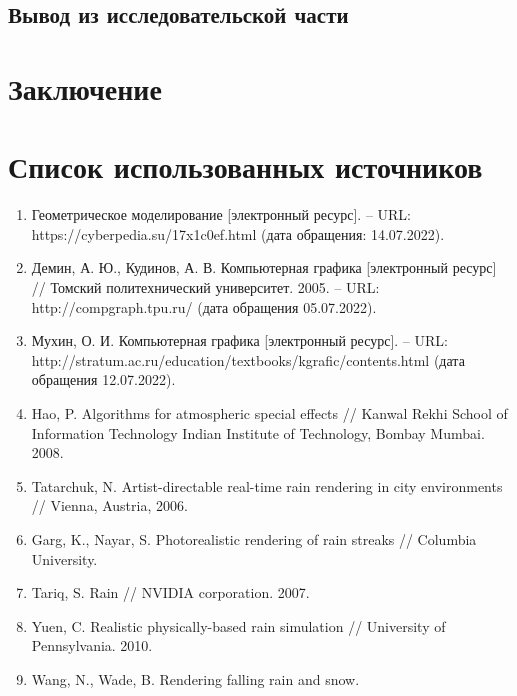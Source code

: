 \section*{Вывод из исследовательской части}

{\center\chapter*{Заключение}}

{\center\chapter*{Список использованных источников}}

\begin{enumerate}
\item
Геометрическое моделирование [электронный ресурс]. – URL: https://cyberpedia.su/17x1c0ef.html (дата обращения: 14.07.2022).
\item
Демин, А. Ю., Кудинов, А. В. Компьютерная графика [электронный ресурс] // Томский политехнический университет. 2005. – URL: http://compgraph.tpu.ru/ (дата обращения 05.07.2022).
\item
Мухин, О. И. Компьютерная графика [электронный ресурс]. – URL: http://stratum.ac.ru/education/textbooks/kgrafic/contents.html (дата обращения 12.07.2022).
\item
Hao, P. Algorithms for atmospheric special effects // Kanwal Rekhi School of Information Technology Indian Institute of Technology, Bombay Mumbai. 2008.
\item
Tatarchuk, N. Artist-directable real-time rain rendering in city environments // Vienna, Austria, 2006.
\item
Garg, K., Nayar, S. Photorealistic rendering of rain streaks // Columbia University.
\item
Tariq, S. Rain // NVIDIA corporation. 2007.
\item
Yuen, C. Realistic physically-based rain simulation // University of Pennsylvania. 2010.
\item
Wang, N., Wade, B. Rendering falling rain and snow.
\end{enumerate}


